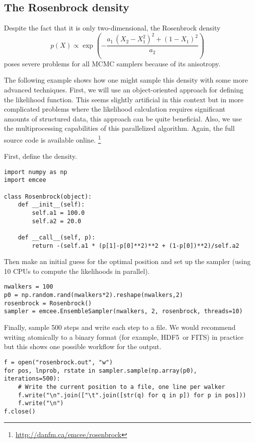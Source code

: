 \documentclass[12pt,preprint]{aastex}
\newcommand{\project}[1]{{\sffamily #1}}
\renewcommand{\vector}[1]{#1}
\begin{document}
\subsection{The Rosenbrock density}

Despite the fact that it is only two-dimensional, the Rosenbrock density
\begin{equation}
    p(\vector{X}) \propto \exp \left ( -\frac{a_1 \,
        (X_2 - X_1^2)^2+ (1-X_1)^2}{a_2} \right )
\end{equation}
poses severe problems for all MCMC samplers because of its anisotropy.

The following example shows how one might sample this density with some more
advanced techniques. First, we will use an object-oriented approach for
defining the likelihood function. This seems slightly artificial in this
context but in more complicated problems where the likelihood calculation
requires significant amounts of structured data, this approach can be
quite beneficial. Also, we use the multiprocessing capabilities of this
parallelized algorithm. Again, the full source code is available online.%
\footnote{\url{http://danfm.ca/emcee/rosenbrock}}

First, define the density.
\begin{lstlisting}
import numpy as np
import emcee

class Rosenbrock(object):
    def __init__(self):
        self.a1 = 100.0
        self.a2 = 20.0

    def __call__(self, p):
        return -(self.a1 * (p[1]-p[0]**2)**2 + (1-p[0])**2)/self.a2
\end{lstlisting}
Then make an initial guess for the optimal position and set up the sampler
(using 10 CPUs to compute the likelihoods in parallel).
\begin{lstlisting}
nwalkers = 100
p0 = np.random.rand(nwalkers*2).reshape(nwalkers,2)
rosenbrock = Rosenbrock()
sampler = emcee.EnsembleSampler(nwalkers, 2, rosenbrock, threads=10)
\end{lstlisting}
Finally, sample 500 steps and write each step to a file. We would recommend
writing atomically to a binary format (for example, \project{HDF5}\ or
\project{FITS}) in practice but this shows one possible
workflow for the output.
\begin{lstlisting}
f = open("rosenbrock.out", "w")
for pos, lnprob, rstate in sampler.sample(np.array(p0), iterations=500):
    # Write the current position to a file, one line per walker
    f.write("\n".join(["\t".join([str(q) for q in p]) for p in pos]))
    f.write("\n")
f.close()
\end{lstlisting}
\end{document}
